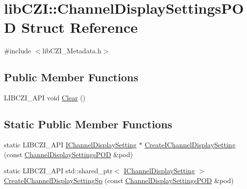 \hypertarget{structlib_c_z_i_1_1_channel_display_settings_p_o_d}{}\section{lib\+C\+ZI\+:\+:Channel\+Display\+Settings\+P\+OD Struct Reference}
\label{structlib_c_z_i_1_1_channel_display_settings_p_o_d}


{\ttfamily \#include $<$lib\+C\+Z\+I\+\_\+\+Metadata.\+h$>$}

\subsection*{Public Member Functions}
\begin{DoxyCompactItemize}
\item 
L\+I\+B\+C\+Z\+I\+\_\+\+A\+PI void \hyperlink{structlib_c_z_i_1_1_channel_display_settings_p_o_d_a4191dc68cd622358ad1786753ebdfb24}{Clear} ()
\end{DoxyCompactItemize}
\subsection*{Static Public Member Functions}
\begin{DoxyCompactItemize}
\item 
static L\+I\+B\+C\+Z\+I\+\_\+\+A\+PI \hyperlink{classlib_c_z_i_1_1_i_channel_display_setting}{I\+Channel\+Display\+Setting} $\ast$ \hyperlink{structlib_c_z_i_1_1_channel_display_settings_p_o_d_a1fcbd1c402caa3e365c4067882335205}{Create\+I\+Channel\+Display\+Setting} (const \hyperlink{structlib_c_z_i_1_1_channel_display_settings_p_o_d}{Channel\+Display\+Settings\+P\+OD} \&pod)
\item 
static L\+I\+B\+C\+Z\+I\+\_\+\+A\+PI std\+::shared\+\_\+ptr$<$ \hyperlink{classlib_c_z_i_1_1_i_channel_display_setting}{I\+Channel\+Display\+Setting} $>$ \hyperlink{structlib_c_z_i_1_1_channel_display_settings_p_o_d_a4c4582399de4ebc3ac1b69f043d0ebd1}{Create\+I\+Channel\+Display\+Setting\+Sp} (const \hyperlink{structlib_c_z_i_1_1_channel_display_settings_p_o_d}{Channel\+Display\+Settings\+P\+OD} \&pod)
\end{DoxyCompactItemize}
